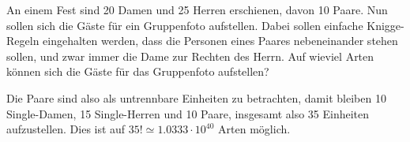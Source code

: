 An einem Fest sind 20 Damen und 25 Herren erschienen, davon
10 Paare. Nun sollen sich die Gäste für ein Gruppenfoto aufstellen.
Dabei sollen einfache Knigge-Regeln eingehalten werden, dass
die Personen eines Paares nebeneinander stehen sollen, und zwar immer
die Dame zur Rechten des Herrn. Auf wieviel Arten können sich
die Gäste für das Gruppenfoto aufstellen?


\begin{loesung}
Die Paare sind also als untrennbare Einheiten zu betrachten, damit
bleiben 10 Single-Damen, 15 Single-Herren und 10 Paare,
insgesamt also 35 Einheiten aufzustellen.
Dies ist auf $35!\simeq 1.0333\cdot 10^{40}$ Arten möglich.
\end{loesung}

